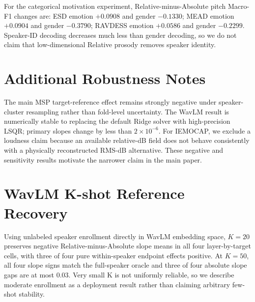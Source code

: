 \documentclass[11pt]{article}
\begin{document}
For the categorical motivation experiment, Relative-minus-Absolute pitch Macro-F1 changes are:
ESD emotion $+0.0908$ and gender $-0.1330$; MEAD emotion $+0.0904$ and gender $-0.3790$; RAVDESS emotion $+0.0586$ and gender $-0.2299$.
Speaker-ID decoding decreases much less than gender decoding, so we do not claim that low-dimensional Relative prosody removes speaker identity.

\section{Additional Robustness Notes}

The main MSP target-reference effect remains strongly negative under speaker-cluster resampling rather than fold-level uncertainty.
The WavLM result is numerically stable to replacing the default Ridge solver with high-precision LSQR; primary slopes change by less than $2\times10^{-6}$.
For IEMOCAP, we exclude a loudness claim because an available relative-dB field does not behave consistently with a physically reconstructed RMS-dB alternative.
These negative and sensitivity results motivate the narrower claim in the main paper.

\section{WavLM K-shot Reference Recovery}

Using unlabeled speaker enrollment directly in WavLM embedding space, $K=20$ preserves negative Relative-minus-Absolute slope means in all four layer-by-target cells, with three of four pure within-speaker endpoint effects positive.
At $K=50$, all four slope signs match the full-speaker oracle and three of four absolute slope gaps are at most 0.03.
Very small K is not uniformly reliable, so we describe moderate enrollment as a deployment result rather than claiming arbitrary few-shot stability.
\end{document}
